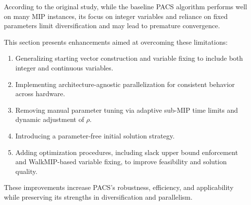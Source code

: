 According to the original study, while the baseline PACS algorithm performs well on many MIP instances, its focus on integer variables and reliance on fixed parameters limit diversification and may lead to premature convergence.

This section presents enhancements aimed at overcoming these limitations:
\begin{enumerate}
\item Generalizing starting vector construction and variable fixing to include both integer and continuous variables.
\item Implementing architecture-agnostic parallelization for consistent behavior across hardware.
\item Removing manual parameter tuning via adaptive sub-MIP time limits and dynamic adjustment of $\rho$.
\item Introducing a parameter-free initial solution strategy.
\item Adding optimization procedures, including slack upper bound enforcement and WalkMIP-based variable fixing, to improve feasibility and solution quality.
\end{enumerate}

These improvements increase PACS’s robustness, efficiency, and applicability while preserving its strengths in diversification and parallelism.

